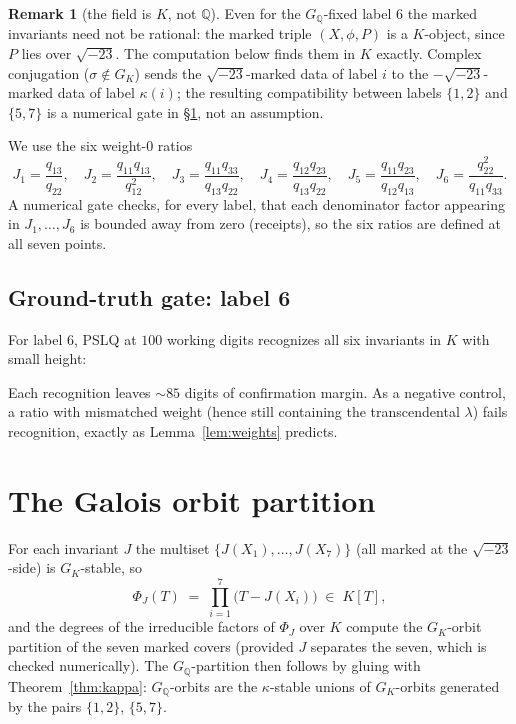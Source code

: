 \documentclass[11pt]{amsart}
\newcommand{\QQ}{\mathbb{Q}}
\newcommand{\GQ}{G_{\QQ}}
\newcommand{\GK}{G_{K}}
\newcommand{\sqm}{\sqrt{-23}}
\newcommand{\kap}{\kappa}
\theoremstyle{plain}
\theoremstyle{definition}
\newtheorem{remark}[theorem]{Remark}
\begin{document}
\begin{remark}[the field is $K$, not $\QQ$]
Even for the $\GQ$-fixed label $6$ the marked invariants need not be
rational: the marked triple $(X,\phi,P)$ is a $K$-object, since $P$
lies over $\sqm$. The computation below finds them in $K$ exactly.
Complex conjugation ($\sigma\notin\GK$) sends the $\sqm$-marked data
of label $i$ to the $-\sqm$-marked data of label $\kap(i)$; the
resulting compatibility between labels $\{1,2\}$ and $\{5,7\}$ is a
numerical gate in \S\ref{sec:partition}, not an assumption.
\end{remark}

We use the six weight-$0$ ratios
\[
  J_1=\frac{q_{13}}{q_{22}},\quad
  J_2=\frac{q_{11}q_{13}}{q_{12}^2},\quad
  J_3=\frac{q_{11}q_{33}}{q_{13}q_{22}},\quad
  J_4=\frac{q_{12}q_{23}}{q_{13}q_{22}},\quad
  J_5=\frac{q_{11}q_{23}}{q_{12}q_{13}},\quad
  J_6=\frac{q_{22}^2}{q_{11}q_{33}}.
\]
A numerical gate checks, for every label, that each denominator
factor appearing in $J_1,\dots,J_6$ is bounded away from zero
(receipts), so the six ratios are defined at all seven points.

\subsection{Ground-truth gate: label 6}
For label $6$, PSLQ at $100$ working digits recognizes all six
invariants in $K$ with small height:
\begin{center}
\LabelSixTable
\end{center}
Each recognition leaves $\sim 85$ digits of confirmation margin. As a
negative control, a ratio with mismatched weight (hence still
containing the transcendental $\lambda$) fails recognition, exactly
as Lemma~\ref{lem:weights} predicts.

\section{The Galois orbit partition}\label{sec:partition}

For each invariant $J$ the multiset $\{J(X_1),\dots,J(X_7)\}$ (all
marked at the $\sqm$-side) is $\GK$-stable, so
\[
  \Phi_J(T) \;=\; \prod_{i=1}^{7}\bigl(T-J(X_i)\bigr)\;\in\;K[T],
\]
and the degrees of the irreducible factors of $\Phi_J$ over $K$
compute the $\GK$-orbit partition of the seven marked covers
(provided $J$ separates the seven, which is checked numerically).
The $\GQ$-partition then follows by gluing with
Theorem~\ref{thm:kappa}: $\GQ$-orbits are the $\kap$-stable unions of
$\GK$-orbits generated by the pairs $\{1,2\}$, $\{5,7\}$.
\end{document}
